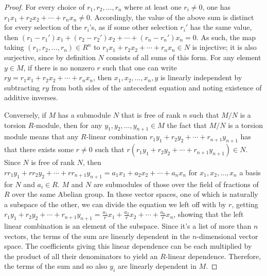 \documentclass{article}
\begin{document}
\begin{proof}
  For every choice of $r_{1}, r_{2}, \ldots, r_{n}$ where at least one $r_{i} \neq 0$, one has $r_{1}x_{1} + r_{2}x_{2} + \cdots + r_{n}x_{n} \neq 0$.
  Accordingly, the value of the above sum is distinct for every selection of the $r_{i}$'s, as if some other selection $r_{i}'$ has the same value,
  then $(r_{1} - r_{1}')x_{1} + (r_{2} - r_{2}')x_{2} + \cdots + (r_{n} - r_{n}')x_{n} = 0$.
  As such, the map taking $(r_{1}, r_{2}, \ldots, r_{n}) \in R^{n}$ to $r_{1}x_{1} + r_{2}x_{2} + \cdots + r_{n}x_{n} \in N$ is injective;
  it is also surjective, since by definition $N$ consists of all sums of this form.
  For any element $y \in M$, if there is no nonzero $r$ such that one can write $ry = r_{1}x_{1} + r_{2}x_{2} + \cdots + r_{n}x_{n}$,
  then $x_{1}, x_{2}, \ldots, x_{n}, y$ is linearly independent by subtracting $ry$ from both sides of the antecedent equation
  and noting existence of additive inverses.

  Conversely, if $M$ has a submodule $N$ that is free of rank $n$ such that $M / N$ is a torsion $R$-module,
  then for any $y_{1}, y_{2}, \ldots, y_{n+1} \in M$ the fact that $M / N$ is a torsion module means that any $R$-linear combination
  $r_{1}y_{1} + r_{2}y_{2} + \cdots + r_{n+1}y_{n+1}$ has that there exists some $r \neq 0$ such that
  $r(r_{1}y_{1} + r_2y_2 + \cdots + r_{n+1}y_{n+1}) \in N$.
  Since $N$ is free of rank $N$, then $rr_{1}y_{1} + rr_{2}y_{2} + \cdots + rr_{n+1}y_{n+1} = a_{1}x_{1} + a_{2}x_{2} + \cdots + a_{n}x_{n}$
  for $x_{1}, x_{2}, \ldots, x_{n}$ a basis for $N$ and $a_{i} \in R$.
  $M$ and $N$ are submodules of those over the field of fractions of $R$ over the same Abelian group.
  In these vector spaces, one of which is naturally a subspace of the other, we can divide the equation we left off with by $r$,
  getting $r_{1}y_{1} + r_{2}y_{2} + \cdots + r_{n+1}y_{n+1} = \frac{a_{1}}{r}x_{1} + \frac{a_{2}}{r}x_{2} + \cdots + \frac{a_{n}}{r}x_{n}$,
  showing that the left linear combination is an element of the subspace.
  Since it's a list of more than $n$ vectors, the terms of the sum are linearly dependent in the $n$-dimensional vector space.
  The coefficients giving this linear dependence can be each multiplied by the product of all their denominators to yield an $R$-linear dependence.
  Therefore, the terms of the sum and so also $y_{i}$ are linearly dependent in $M$.
\end{proof}
\end{document}
